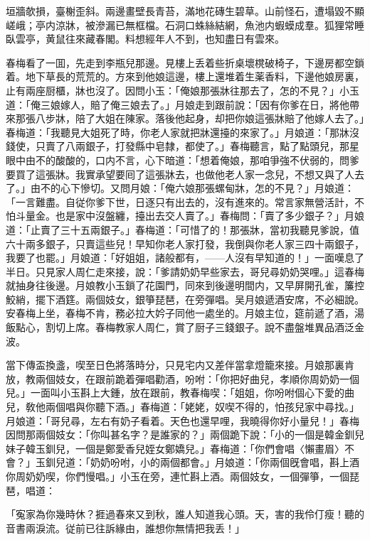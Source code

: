 垣牆欹損，臺榭歪斜。兩邊畫壁長青苔，滿地花磚生碧草。山前怪石，遭塌毀不顯嵯峨；亭内涼牀，被滲漏已無框檔。石洞口蛛絲結網，魚池内蝦蟆成羣。狐狸常睡臥雲亭，黄鼠往來藏春閣。料想經年人不到，也知盡日有雲來。

春梅看了一囬，先走到李瓶兒那邊。見樓上丢着些折桌壞櫈破椅子，下邊房都空鎖着。地下草長的荒荒的。方來到他娘這邊，樓上還堆着生薬香料，下邊他娘房裏，止有兩座厨櫃，牀也沒了。因問小玉：「俺娘那張牀往那去了，怎的不見？」小玉道：「俺三娘嫁人，賠了俺三娘去了。」月娘走到跟前說：「因有你爹在日，將他帶來那張八步牀，陪了大姐在陳家。落後他起身，却把你娘這張牀賠了他嫁人去了。」春梅道：「我聽見大姐死了時，你老人家就把牀還擡的來家了。」月娘道：「那牀沒錢使，只賣了八兩銀子，打發縣中皂隸，都使了。」春梅聽言，點了點頭兒，那星眼中由不的酸酸的，口内不言，心下暗道：「想着俺娘，那咱爭強不伏弱的，問爹要買了這張牀。我實承望要囘了這張牀去，也做他老人家一念兒，不想又與了人去了。」由不的心下慘切。又問月娘：「俺六娘那張螺甸牀，怎的不見？」月娘道：「一言難盡。自従你爹下世，日逐只有出去的，沒有進來的。常言家無營活計，不怕斗量金。也是家中沒盤纏，擡出去交人賣了。」春梅問：「賣了多少銀子？」月娘道：「止賣了三十五兩銀子。」春梅道：「可惜了的！那張牀，當初我聽見爹說，值六十兩多銀子，只賣這些兒！早知你老人家打發，我倒與你老人家三四十兩銀子，我要了也罷。」月娘道：「好姐姐，諸般都有，——人沒有早知道的！」一面嘆息了半日。只見家人周仁走來接，說：「爹請奶奶早些家去，哥兒尋奶奶哭哩。」這春梅就抽身往後邊。月娘教小玉鎖了花園門，同來到後邊明間内，又早屏開孔雀，簾控鮫綃，擺下酒筳。兩個妓女，銀箏琵琶，在旁彈唱。吴月娘遞酒安席，不必細說。安春梅上坐，春梅不肯，務必拉大妗子同他一處坐的。月娘主位，筵前遞了酒，湯飯點心，割切上席。春梅教家人周仁，賞了厨子三錢銀子。說不盡盤堆異品酒泛金波。

當下傳盃換盞，喫至日色將落時分，只見宅内又差伴當拿燈籠來接。月娘那裏肯放，教兩個妓女，在跟前跪着彈唱勸酒，吩咐：「你把好曲兒，孝順你周奶奶一個兒。」一面叫小玉斟上大鍾，放在跟前，教春梅喫：「姐姐，你吩咐個心下愛的曲兒，敎他兩個唱與你聽下酒。」春梅道：「姥姥，奴喫不得的，怕孩兒家中尋找。」月娘道：「哥兒尋，左右有奶子看着。天色也還早哩，我曉得你好小量兒！」春梅因問那兩個妓女：「你叫甚名字？是誰家的？」兩個跪下說：「小的一個是韓金釧兒妹子韓玉釧兒，一個是鄭愛香兒姪女鄭嬌兒。」春梅道：「你們會唱〈懶畫眉〉不會？」玉釧兒道：「奶奶吩咐，小的兩個都會。」月娘道：「你兩個旣會唱，斟上酒你周奶奶喫，你們慢唱。」小玉在旁，連忙斟上酒。兩個妓女，一個彈箏，一個琵琶，唱道：

「寃家為你幾時休？捱過春來又到秋，誰人知道我心頭。天，害的我伶仃瘦！聽的音書兩淚流。従前已往訴緣由，誰想你無情把我丢！」

